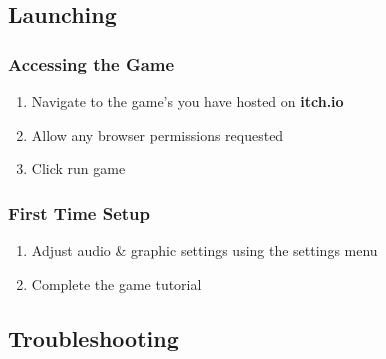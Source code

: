 \documentclass[11pt, a4paper]{article}
\begin{document}
\subsection{Launching}

\subsubsection{Accessing the Game}

\begin{enumerate}
    \item Navigate to the game’s  you have hosted on \textbf{itch.io}
    \item Allow any browser permissions requested
    \item Click run game
\end{enumerate}

\subsubsection{First Time Setup}

\begin{enumerate}
    \item Adjust audio \& graphic settings using the settings menu
    \item Complete the game tutorial
\end{enumerate}

\subsection{Troubleshooting}
\end{document}
